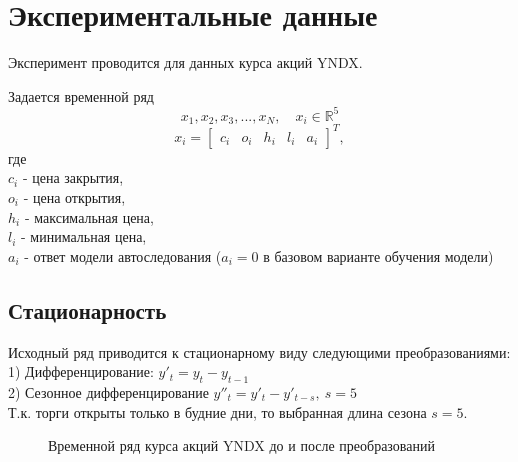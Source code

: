 \newpage

\section{Экспериментальные данные}

Эксперимент проводится для данных курса акций YNDX.

Задается временной ряд 
$$x_{1}, x_{2}, x_{3}, ..., x_{N}, \quad x_{i} \in \mathbb{R}^{5}$$
$$
    x_{i} = 
    \begin{bmatrix}
        c_{i} & o_{i} & h_{i} & l_{i} & a_{i}
    \end{bmatrix}^{T},
$$
где \\
$c_{i}$ - цена закрытия, \\
$o_{i}$ - цена открытия, \\
$h_{i}$ - максимальная цена, \\
$l_{i}$ - минимальная цена, \\
$a_{i}$ - ответ модели автоследования ($a_{i} = 0$ в базовом варианте обучения модели)

\subsection{Стационарность}

Исходный ряд приводится к стационарному виду следующими преобразованиями: \\
1) Дифференцирование: $y'_{t} = y_{t} - y_{t-1}$ \\ 
2) Сезонное дифференцирование $y''_{t} = y'_{t} - y'_{t-s}, \ s=5$ \\

Т.к. торги открыты только в будние дни, то выбранная длина сезона $s=5$.

\begin{figure}[h!t]\center
{}
\caption{Временной ряд курса акций YNDX до и после преобразований}
\end{figure}

